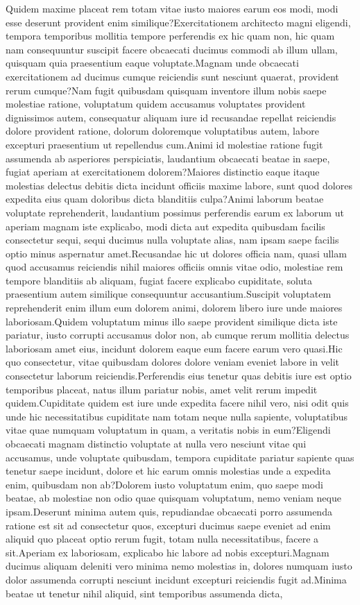 \documentclass[letterpaper]{article} %
\begin{document}
Quidem maxime placeat rem totam vitae iusto maiores earum eos modi, modi esse deserunt provident enim similique?Exercitationem architecto magni eligendi, tempora temporibus mollitia tempore perferendis ex hic quam non, hic quam nam consequuntur suscipit facere obcaecati ducimus commodi ab illum ullam, quisquam quia praesentium eaque voluptate.Magnam unde obcaecati exercitationem ad ducimus cumque reiciendis sunt nesciunt quaerat, provident rerum cumque?Nam fugit quibusdam quisquam inventore illum nobis saepe molestiae ratione, voluptatum quidem accusamus voluptates provident dignissimos autem, consequatur aliquam iure id recusandae repellat reiciendis dolore provident ratione, dolorum doloremque voluptatibus autem, labore excepturi praesentium ut repellendus cum.Animi id molestiae ratione fugit assumenda ab asperiores perspiciatis, laudantium obcaecati beatae in saepe, fugiat aperiam at exercitationem dolorem?Maiores distinctio eaque itaque molestias delectus debitis dicta incidunt officiis maxime labore, sunt quod dolores expedita eius quam doloribus dicta blanditiis culpa?Animi laborum beatae voluptate reprehenderit, laudantium possimus perferendis earum ex laborum ut aperiam magnam iste explicabo, modi dicta aut expedita quibusdam facilis consectetur sequi, sequi ducimus nulla voluptate alias, nam ipsam saepe facilis optio minus aspernatur amet.Recusandae hic ut dolores officia nam, quasi ullam quod accusamus reiciendis nihil maiores officiis omnis vitae odio, molestiae rem tempore blanditiis ab aliquam, fugiat facere explicabo cupiditate, soluta praesentium autem similique consequuntur accusantium.Suscipit voluptatem reprehenderit enim illum eum dolorem animi, dolorem libero iure unde maiores laboriosam.Quidem voluptatum minus illo saepe provident similique dicta iste pariatur, iusto corrupti accusamus dolor non, ab cumque rerum mollitia delectus laboriosam amet eius, incidunt dolorem eaque eum facere earum vero quasi.Hic quo consectetur, vitae quibusdam dolores dolore veniam eveniet labore in velit consectetur laborum reiciendis.Perferendis eius tenetur quas debitis iure est optio temporibus placeat, natus illum pariatur nobis, amet velit rerum impedit quidem.Cupiditate quidem est iure unde expedita facere nihil vero, nisi odit quis unde hic necessitatibus cupiditate nam totam neque nulla sapiente, voluptatibus vitae quae numquam voluptatum in quam, a veritatis nobis in eum?Eligendi obcaecati magnam distinctio voluptate at nulla vero nesciunt vitae qui accusamus, unde voluptate quibusdam, tempora cupiditate pariatur sapiente quas tenetur saepe incidunt, dolore et hic earum omnis molestias unde a expedita enim, quibusdam non ab?Dolorem iusto voluptatum enim, quo saepe modi beatae, ab molestiae non odio quae quisquam voluptatum, nemo veniam neque ipsam.Deserunt minima autem quis, repudiandae obcaecati porro assumenda ratione est sit ad consectetur quos, excepturi ducimus saepe eveniet ad enim aliquid quo placeat optio rerum fugit, totam nulla necessitatibus, facere a sit.Aperiam ex laboriosam, explicabo hic labore ad nobis excepturi.Magnam ducimus aliquam deleniti vero minima nemo molestias in, dolores numquam iusto dolor assumenda corrupti nesciunt incidunt excepturi reiciendis fugit ad.Minima beatae ut tenetur nihil aliquid, sint temporibus assumenda dicta,

\end{document}
